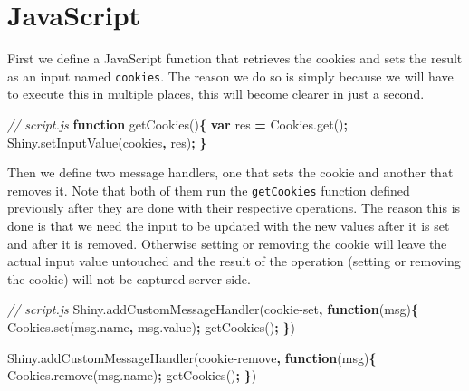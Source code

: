 \documentclass[
]{krantz}
\makeatletter
\newenvironment{Shaded}{\begin{snugshade}}{\end{snugshade}}
\newcommand{\AttributeTok}[1]{\textcolor[rgb]{0.61,0.61,0.61}{#1}}
\newcommand{\CommentTok}[1]{\textcolor[rgb]{0.37,0.37,0.37}{\textit{#1}}}
\newcommand{\KeywordTok}[1]{\textcolor[rgb]{0.27,0.27,0.27}{\textbf{#1}}}
\newcommand{\NormalTok}[1]{#1}
\newcommand{\OperatorTok}[1]{\textcolor[rgb]{0.43,0.43,0.43}{\textbf{#1}}}
\newcommand{\StringTok}[1]{\textcolor[rgb]{0.5,0.5,0.5}{#1}}
\newcommand{\VariableTok}[1]{\textcolor[rgb]{0,0,0}{#1}}
\newenvironment{kframe}{%
\medskip{}
\setlength{\fboxsep}{.8em}
 \def\at@end@of@kframe{}%
 \ifinner\ifhmode%
  \def\at@end@of@kframe{\end{minipage}}%
  \begin{minipage}{\columnwidth}%
 \fi\fi%
 \def\FrameCommand##1{\hskip\@totalleftmargin \hskip-\fboxsep
 \colorbox{shadecolor}{##1}\hskip-\fboxsep
     \hskip-\linewidth \hskip-\@totalleftmargin \hskip\columnwidth}%
 \MakeFramed {\advance\hsize-\width
   \@totalleftmargin\z@ \linewidth\hsize
   \@setminipage}}%
 {\par\unskip\endMakeFramed%
 \at@end@of@kframe}
\renewenvironment{Shaded}{\begin{kframe}}{\end{kframe}}
\makeatother
\begin{document}
\hypertarget{javascript}{%
\section{JavaScript}\label{javascript}}

First we define a JavaScript function that retrieves the cookies and sets the result as an input named \texttt{cookies}. The reason we do so is simply because we will have to execute this in multiple places, this will become clearer in just a second.

\begin{Shaded}
\begin{Highlighting}[]
\CommentTok{// script.js}
\KeywordTok{function} \AttributeTok{getCookies}\NormalTok{()}\OperatorTok{\{}
  \KeywordTok{var}\NormalTok{ res }\OperatorTok{=} \VariableTok{Cookies}\NormalTok{.}\AttributeTok{get}\NormalTok{()}\OperatorTok{;}
  \VariableTok{Shiny}\NormalTok{.}\AttributeTok{setInputValue}\NormalTok{(}\StringTok{\textquotesingle{}cookies\textquotesingle{}}\OperatorTok{,}\NormalTok{ res)}\OperatorTok{;}
\OperatorTok{\}}
\end{Highlighting}
\end{Shaded}

Then we define two message handlers, one that sets the cookie and another that removes it. Note that both of them run the \texttt{getCookies} function defined previously after they are done with their respective operations. The reason this is done is that we need the input to be updated with the new values after it is set and after it is removed. Otherwise setting or removing the cookie will leave the actual input value untouched and the result of the operation (setting or removing the cookie) will not be captured server-side.

\begin{Shaded}
\begin{Highlighting}[]
\CommentTok{// script.js}
\VariableTok{Shiny}\NormalTok{.}\AttributeTok{addCustomMessageHandler}\NormalTok{(}\StringTok{\textquotesingle{}cookie{-}set\textquotesingle{}}\OperatorTok{,} \KeywordTok{function}\NormalTok{(msg)}\OperatorTok{\{}
  \VariableTok{Cookies}\NormalTok{.}\AttributeTok{set}\NormalTok{(}\VariableTok{msg}\NormalTok{.}\AttributeTok{name}\OperatorTok{,} \VariableTok{msg}\NormalTok{.}\AttributeTok{value}\NormalTok{)}\OperatorTok{;}
  \AttributeTok{getCookies}\NormalTok{()}\OperatorTok{;}
\OperatorTok{\}}\NormalTok{)}

\VariableTok{Shiny}\NormalTok{.}\AttributeTok{addCustomMessageHandler}\NormalTok{(}\StringTok{\textquotesingle{}cookie{-}remove\textquotesingle{}}\OperatorTok{,} \KeywordTok{function}\NormalTok{(msg)}\OperatorTok{\{}
  \VariableTok{Cookies}\NormalTok{.}\AttributeTok{remove}\NormalTok{(}\VariableTok{msg}\NormalTok{.}\AttributeTok{name}\NormalTok{)}\OperatorTok{;}
  \AttributeTok{getCookies}\NormalTok{()}\OperatorTok{;}
\OperatorTok{\}}\NormalTok{)}
\end{Highlighting}
\end{Shaded}
\end{document}
